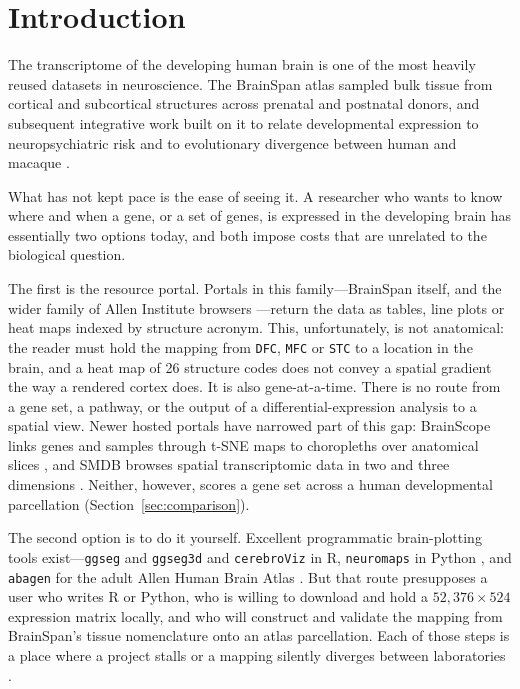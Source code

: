 \documentclass[pdflatex,sn-basic]{sn-jnl}
\begin{document}
\section{Introduction}\label{sec:intro}

The transcriptome of the developing human brain is one of the most heavily
reused datasets in neuroscience. The BrainSpan atlas
\citep{BrainSpan2011,Kang2011,Miller2014} sampled bulk tissue from cortical and
subcortical structures across prenatal and postnatal donors, and subsequent
integrative work built on it to relate developmental expression to
neuropsychiatric risk \citep{Li2018} and to evolutionary divergence between
human and macaque \citep{Zhu2018}.

What has not kept pace is the ease of seeing it. A researcher who wants
to know where and when a gene, or a set of genes, is expressed in the developing
brain has essentially two options today, and both impose costs that are
unrelated to the biological question.

The first is the resource portal. Portals in this family---BrainSpan itself, and
the wider family of Allen Institute browsers \citep{Lau2008,Sunkin2013}---return
the data as tables, line plots or heat maps indexed by structure acronym. This, unfortunately, is 
not anatomical: the reader must hold the mapping from
\texttt{DFC}, \texttt{MFC} or \texttt{STC} to a location in the brain, 
and a heat map of 26 structure codes does not convey a spatial gradient
the way a rendered cortex does. It is also gene-at-a-time. There is no route
from a gene set, a pathway, or the output of a differential-expression analysis
to a spatial view. Newer hosted portals have narrowed part of this gap:
BrainScope links genes and samples through t-SNE maps to choropleths over
anatomical slices \citep{Huisman2017}, and SMDB browses spatial transcriptomic
data in two and three dimensions \citep{Cao2023}. Neither, however, scores a
gene set across a human developmental parcellation
(Section~\ref{sec:comparison}).

The second option is to do it yourself. Excellent programmatic brain-plotting
tools exist---\texttt{ggseg} and \texttt{ggseg3d} \citep{Mowinckel2020} and
\texttt{cerebroViz} \citep{Bahl2017} in R, \texttt{neuromaps} in Python
\citep{Markello2022}, and \texttt{abagen} for the adult Allen Human Brain Atlas
\citep{Hawrylycz2012,Markello2021}. But that route presupposes a user who
writes R or Python, who is willing to download and hold a $52{,}376 \times 524$
expression matrix locally, and who will construct and validate the mapping from
BrainSpan's tissue nomenclature onto an atlas parcellation. Each of those steps
is a place where a project stalls or a mapping silently diverges between
laboratories \citep{Markello2021}.
\end{document}
